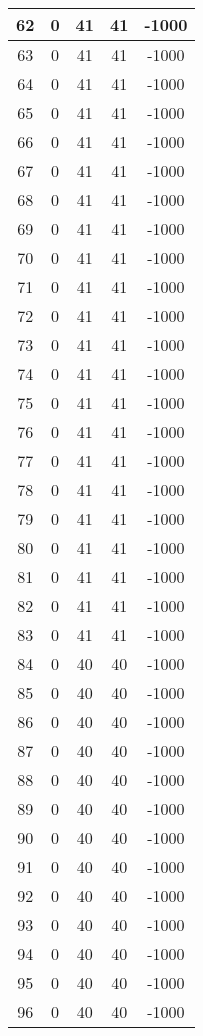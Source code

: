 \documentclass[letterpaper, 12pt]{article}
\begin{document}
\begin{longtable}{|c|c|c|c|c|}
\hline
62 & 0 & 41 & 41 & -1000 \\
\hline
63 & 0 & 41 & 41 & -1000 \\
\hline
64 & 0 & 41 & 41 & -1000 \\
\hline
65 & 0 & 41 & 41 & -1000 \\
\hline
66 & 0 & 41 & 41 & -1000 \\
\hline
67 & 0 & 41 & 41 & -1000 \\
\hline
68 & 0 & 41 & 41 & -1000 \\
\hline
69 & 0 & 41 & 41 & -1000 \\
\hline
70 & 0 & 41 & 41 & -1000 \\
\hline
71 & 0 & 41 & 41 & -1000 \\
\hline
72 & 0 & 41 & 41 & -1000 \\
\hline
73 & 0 & 41 & 41 & -1000 \\
\hline
74 & 0 & 41 & 41 & -1000 \\
\hline
75 & 0 & 41 & 41 & -1000 \\
\hline
76 & 0 & 41 & 41 & -1000 \\
\hline
77 & 0 & 41 & 41 & -1000 \\
\hline
78 & 0 & 41 & 41 & -1000 \\
\hline
79 & 0 & 41 & 41 & -1000 \\
\hline
80 & 0 & 41 & 41 & -1000 \\
\hline
81 & 0 & 41 & 41 & -1000 \\
\hline
82 & 0 & 41 & 41 & -1000 \\
\hline
83 & 0 & 41 & 41 & -1000 \\
\hline
84 & 0 & 40 & 40 & -1000 \\
\hline
85 & 0 & 40 & 40 & -1000 \\
\hline
86 & 0 & 40 & 40 & -1000 \\
\hline
87 & 0 & 40 & 40 & -1000 \\
\hline
88 & 0 & 40 & 40 & -1000 \\
\hline
89 & 0 & 40 & 40 & -1000 \\
\hline
90 & 0 & 40 & 40 & -1000 \\
\hline
91 & 0 & 40 & 40 & -1000 \\
\hline
92 & 0 & 40 & 40 & -1000 \\
\hline
93 & 0 & 40 & 40 & -1000 \\
\hline
94 & 0 & 40 & 40 & -1000 \\
\hline
95 & 0 & 40 & 40 & -1000 \\
\hline
96 & 0 & 40 & 40 & -1000 \\

\end{longtable}
\end{document}
